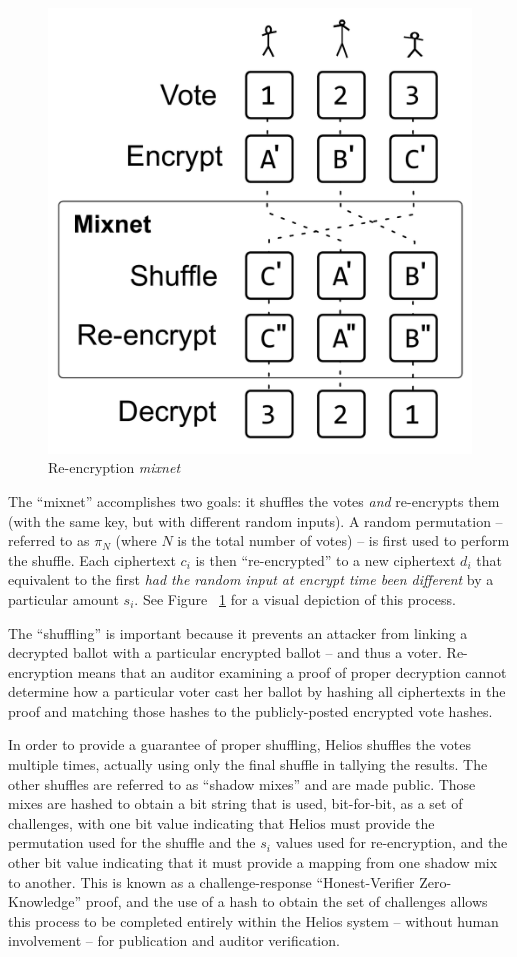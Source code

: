 \documentclass[10pt,twocolumn]{article}
\newcommand{\term}[1]{\textit{#1}}
\begin{document}
\begin{figure}
	\center
	\includegraphics[width=0.8\columnwidth]{images/include/mixnet.pdf}
	\caption{Re-encryption \term{mixnet}}
	\label{fig:mixnet}
\end{figure}

The ``mixnet'' accomplishes two goals: it shuffles the votes \emph{and} re-encrypts them (with the
same key, but with different random inputs). A random permutation -- referred to as $\pi_{N}$ (where
$N$ is the total number of votes) -- is first used to perform the shuffle. Each ciphertext
$c_{i}$ is then ``re-encrypted'' to a new ciphertext $d_{i}$ that equivalent to the first \emph{had
the random input at encrypt time been different} by a particular amount $s_{i}$. See Figure
~\ref{fig:mixnet} for a visual depiction of this process.

The ``shuffling'' is important because it prevents an attacker from linking a decrypted ballot with
a particular encrypted ballot -- and thus a voter. Re-encryption means that an auditor examining a
proof of proper decryption cannot determine how a particular voter cast her ballot by hashing
all ciphertexts in the proof and matching those hashes to the publicly-posted encrypted vote hashes.

In order to provide a guarantee of proper shuffling, Helios shuffles the votes multiple
times, actually using only the final shuffle in tallying the results. The other shuffles are
referred to as ``shadow mixes'' and are made public. Those mixes are hashed to obtain a bit string
that is used, bit-for-bit, as a set of challenges, with one bit value indicating that Helios must
provide the permutation used for the shuffle and the $s_{i}$ values used for re-encryption, and the
other bit value indicating that it must provide a mapping from one shadow mix to another. This is
known as a challenge-response ``Honest-Verifier Zero-Knowledge'' proof, and the use of a hash to
obtain the set of challenges allows this process to be completed entirely within the Helios system
-- without human involvement -- for publication and auditor verification.
\end{document}
